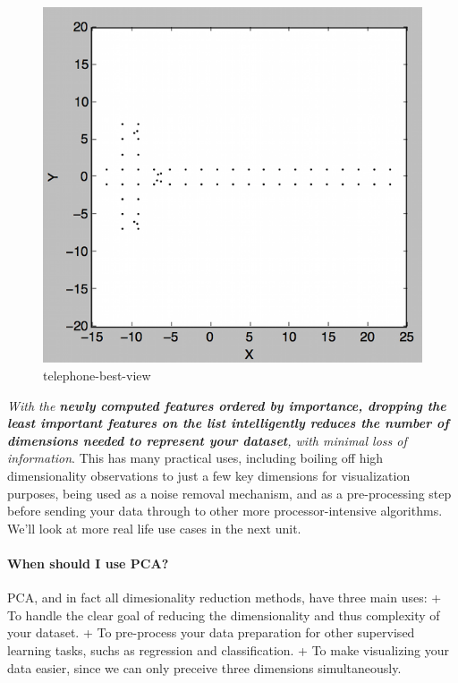 \documentclass[11pt]{article}
\makeatletter
\def\maxwidth{\ifdim\Gin@nat@width>\linewidth\linewidth
    \else\Gin@nat@width\fi}
\let\Oldincludegraphics\includegraphics
\renewcommand{\includegraphics}[1]{\Oldincludegraphics[width=.8\maxwidth]{#1}}
\makeatother
\begin{document}
\begin{figure}
\centering
\includegraphics{pic/telephone-best-view.png}
\caption{telephone-best-view}
\end{figure}

\emph{With the \textbf{newly computed features ordered by importance,
dropping the least important features on the list intelligently reduces
the number of dimensions needed to represent your dataset}, with minimal
loss of information}. This has many practical uses, including boiling
off high dimensionality observations to just a few key dimensions for
visualization purposes, being used as a noise removal mechanism, and as
a pre-processing step before sending your data through to other more
processor-intensive algorithms. We'll look at more real life use cases
in the next unit.

\paragraph{When should I use PCA?}\label{when-should-i-use-pca}

PCA, and in fact all dimesionality reduction methods, have three main
uses: + To handle the clear goal of reducing the dimensionality and thus
complexity of your dataset. + To pre-process your data preparation for
other supervised learning tasks, suchs as regression and classification.
+ To make visualizing your data easier, since we can only preceive three
dimensions simultaneously.
\end{document}
